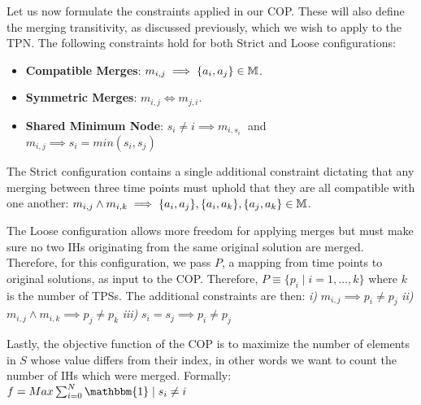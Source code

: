 Let us now formulate the constraints applied in our COP.
These will also define the merging transitivity, as discussed previously, which we wish to apply to the TPN. 
The following constraints hold for both Strict and Loose configurations:
\begin{itemize}
    \item\textbf{Compatible Merges}:  $m_{i, j} \implies \{a_i, a_j\} \in \mathbb{M}$.
    \item \textbf{Symmetric Merges}:  $m_{i, j} \iff m_{j, i}$.
    \item \textbf{Shared Minimum Node}:  $s_i \neq i \implies m_{i, s_i} \;$ and\\
    $m_{i, j} \implies s_i = min(s_i, s_j)$
\end{itemize}

The Strict configuration contains a single additional constraint dictating that any merging between three time points must uphold that they are all compatible with one another:
 $m_{i, j} \wedge m_{i, k} \implies \{a_i, a_j\},\{a_i, a_k\},\{a_j, a_k\} \in \mathbb{M}$.
    
The Loose configuration allows more freedom for applying merges but must make sure no two IHs originating from the same original solution are merged. Therefore, for this configuration, we pass $P$, a mapping from time points to original solutions, as input to the COP. Therefore, $P \equiv \{p_i \mid  i = 1,...,k \}$ where $k$ is the number of TPSs. The additional constraints are then:  
\textit{i)} $m_{i, j} \implies p_i \neq p_j$ \textit{ii)} $m_{i, j} \wedge m_{i, k} \implies p_j \neq p_k $ \textit{iii)} $ s_i = s_j \implies p_i \neq p_j$

Lastly, the objective function of the COP is to maximize the number of elements in $S$ whose value differs from their index, in other words we want to count the number of IHs which were merged. Formally: 
$f = Max \sum_{i=0}^{N} \mathbbm{1} \;|\;s_i \neq i$